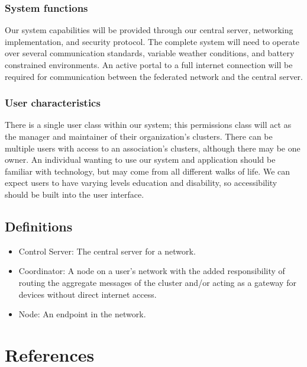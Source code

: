 \documentclass[tikz,a4paper,titlepage]{article}
\begin{document}
\subsubsection{System functions}
Our system capabilities will be provided through our central server, networking implementation, and security protocol. The complete system will need to operate over several communication standards, variable weather conditions, and battery constrained environments. An active portal to a full internet connection will be required for communication between the federated network and the central server.

\subsubsection{User characteristics}
There is a single user class within our system; this permissions class will act as the manager and maintainer of their organization’s clusters. There can be multiple users with access to an association's clusters, although there may be one owner. An individual wanting to use our system and application should be familiar with technology, but may come from all different walks of life. We can expect users to have varying levels education and disability, so accessibility should be built into the user interface. 

\subsection{Definitions}
\begin{itemize}
    \item Control Server: The central server for a network.
    \item Coordinator: A node on a user's network with the added responsibility of routing the aggregate messages of the cluster and/or acting as a gateway for devices without direct internet access.
    \item Node: An endpoint in the network.
\end{itemize}

\section{References}

\begingroup
\renewcommand{\section}[2]{}%


\endgroup
\end{document}
